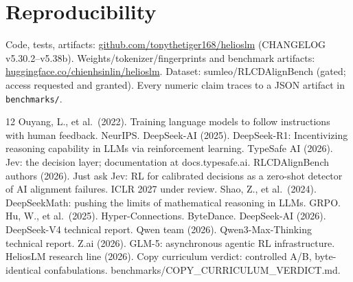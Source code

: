 \documentclass[11pt]{article}
\begin{document}
\section*{Reproducibility}

Code, tests, artifacts: \url{github.com/tonythetiger168/helioslm}
(CHANGELOG v5.30.2--v5.38b). Weights/tokenizer/fingerprints and benchmark
artifacts: \url{huggingface.co/chienhsinlin/helioslm}. Dataset:
sumleo/RLCDAlignBench (gated; access requested and granted). Every
numeric claim traces to a JSON artifact in \texttt{benchmarks/}.

\begin{thebibliography}{12}
Ouyang, L., et al.\ (2022). Training language models to follow
instructions with human feedback. NeurIPS.
DeepSeek-AI (2025). DeepSeek-R1: Incentivizing reasoning capability in
LLMs via reinforcement learning.
TypeSafe AI (2026). Jev: the decision layer; documentation at
docs.typesafe.ai.
RLCDAlignBench authors (2026). Just ask Jev: RL for calibrated decisions
as a zero-shot detector of AI alignment failures. ICLR 2027 under
review.
Shao, Z., et al.\ (2024). DeepSeekMath: pushing the limits of
mathematical reasoning in LLMs. GRPO.
Hu, W., et al.\ (2025). Hyper-Connections. ByteDance.
DeepSeek-AI (2026). DeepSeek-V4 technical report.
Qwen team (2026). Qwen3-Max-Thinking technical report.
Z.ai (2026). GLM-5: asynchronous agentic RL infrastructure.
HeliosLM research line (2026). Copy curriculum verdict: controlled A/B,
byte-identical confabulations. benchmarks/COPY\_CURRICULUM\_VERDICT.md.
\end{thebibliography}
\end{document}
